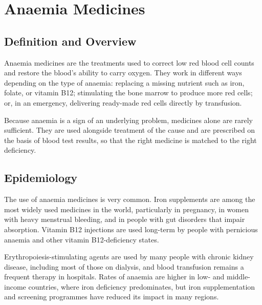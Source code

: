 \chapter{Anaemia Medicines}

\section*{Definition and Overview}
Anaemia medicines are the treatments used to correct low red blood cell counts and restore the blood's ability to carry oxygen. They work in different ways depending on the type of anaemia: replacing a missing nutrient such as iron, folate, or vitamin B12; stimulating the bone marrow to produce more red cells; or, in an emergency, delivering ready-made red cells directly by transfusion.

Because anaemia is a sign of an underlying problem, medicines alone are rarely sufficient. They are used alongside treatment of the cause and are prescribed on the basis of blood test results, so that the right medicine is matched to the right deficiency.

\section*{Epidemiology}
The use of anaemia medicines is very common. Iron supplements are among the most widely used medicines in the world, particularly in pregnancy, in women with heavy menstrual bleeding, and in people with gut disorders that impair absorption. Vitamin B12 injections are used long-term by people with pernicious anaemia and other vitamin B12-deficiency states.

Erythropoiesis-stimulating agents are used by many people with chronic kidney disease, including most of those on dialysis, and blood transfusion remains a frequent therapy in hospitals. Rates of anaemia are higher in low- and middle-income countries, where iron deficiency predominates, but iron supplementation and screening programmes have reduced its impact in many regions.

